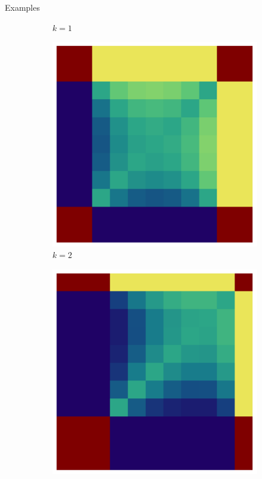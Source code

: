 \documentclass{beamer}
\theoremstyle{definition}
\begin{document}
\begin{frame}[shrink=10]{Examples}
\begin{figure}[H]
\begin{subfigure}[b]{0.185\textwidth}
        \caption{$k=1$}
        \label{fig:ppkBG_4_1}
    \end{subfigure}
    \hspace{0.00\textwidth} %
    \begin{subfigure}[b]{0.185\textwidth}
        \includegraphics[width=\textwidth]{img/ppkB_Plot_4_2_10.png}
        \caption{$k=2$}
        \label{fig:ppkBG_4_2}
    \end{subfigure}
    \hspace{0.00\textwidth} %
        \begin{subfigure}[b]{0.185\textwidth}
        \includegraphics[width=\textwidth]{img/ppkB_Plot_4_3_10.png}

\end{subfigure}
\end{figure}
\end{frame}
\end{document}
